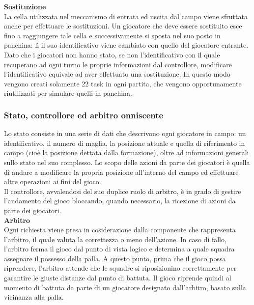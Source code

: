 \textbf{Sostituzione}\\

La cella utilizzata nel meccanismo di entrata ed uscita dal campo viene sfruttata anche per effettuare le sostituzioni. Un giocatore che deve essere sostituito esce fino a raggiungere tale cella e successivamente si sposta nel suo posto in panchina: lì il suo identificativo viene cambiato con quello del giocatore entrante. Dato che i giocatori non hanno stato, se non l'identificativo con il quale recuperano ad ogni turno le proprie informazioni dal controllore, modificare l'identificativo equivale ad aver effettuato una sostituzione. In questo modo vengono creati solamente 22 task in ogni partita, che vengono opportunamente riutilizzati per simulare quelli in panchina.\\

\subsubsection{Stato, controllore ed arbitro onniscente}
\label{sec:analisi_concorrenza_controllore_arbitro}

Lo stato consiste in una serie di dati che descrivono ogni giocatore in campo: un identificativo, il numero di maglia, la posizione attuale e quella di riferimento in campo (cioè la posizione dettata dalla formazione), oltre ad informazioni generali sullo stato nel suo complesso. Lo scopo delle azioni da parte dei giocatori è quella di andare a modificare la propria posizione all'interno del campo ed effettuare altre operazioni ai fini del gioco.\\

Il controllore, avvalendosi del suo duplice ruolo di arbitro, è in grado di gestire l'andamento del gioco bloccando, quando necessario, la ricezione di azioni da parte dei giocatori.\\

\textbf{Arbitro}\\

Ogni richiesta viene presa in cosiderazione dalla componente che rappresenta l'arbitro, il quale valuta la correttezza o meno dell'azione. In caso di fallo, l'arbitro ferma il gioco dal punto di vista logico e determina a quale squadra assegnare il possesso della palla. A questo punto, prima che il gioco possa riprendere, l'arbitro attende che le squadre si riposizionino correttamente per garantire le giuste distanze dal punto di battuta. Il gioco riprende quindi al momento di battuta da parte di un giocatore designato dall'arbitro, basato sulla vicinanza alla palla.\\

